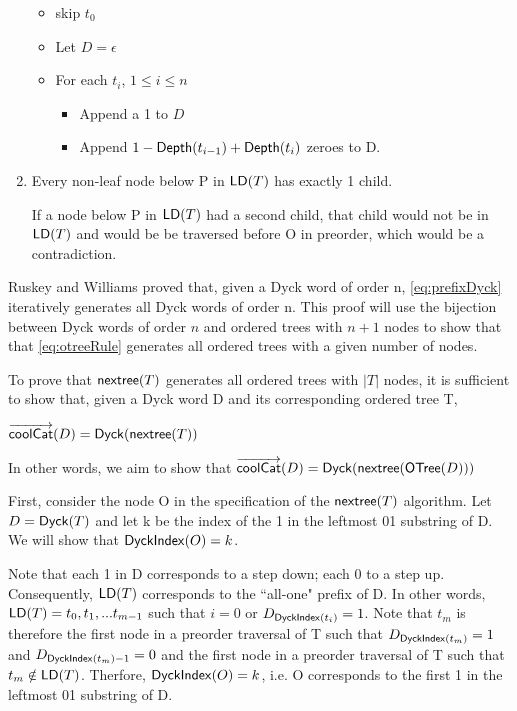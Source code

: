\begin{enumerate}
	\begin{itemize}
 	\item skip $t_0$
	    \item Let $D=\epsilon$ %
	\item For each $t_i$, $1\le i \le n$
	\begin{itemize}
 	\item Append a 1 to $D$
	\item Append $1-\mathsf{Depth}{(t_{i-1})}+\mathsf{Depth}{(t_{i})}$ zeroes to D.
 \end{itemize}
 \end{itemize}
 \item Every non-leaf node below P in $\mathsf{LD}{(T)}$ has exactly 1 child.  

     If a node below P in $\mathsf{LD}{(T)}$ had a second child, that child would not be in $\mathsf{LD}{(T)}$ and would be be traversed before O in preorder, which would be a contradiction. 


\end{enumerate}

Ruskey and Williams proved that, given a Dyck word of order n, \ref{eq:prefixDyck} iteratively generates all Dyck words of order n.  This proof will use the bijection between Dyck words of order $n$ and ordered trees with $n+1$ nodes to show that that \ref{eq:otreeRule} generates all ordered trees with a given number of nodes.  

To prove that $\mathsf{nextree}{(T)}$ generates all ordered trees with $|T|$ nodes, it is sufficient to show that, given a Dyck word D and its corresponding ordered tree T, 

$\overrightarrow{\mathsf{coolCat}}{(D)}=\mathsf{Dyck}{(\mathsf{nextree}{(T)})}$

\bigskip


In other words, we aim to show that $\overrightarrow{\mathsf{coolCat}}{(D)}=\mathsf{Dyck}{(\mathsf{nextree}{(\mathsf{OTree}{(D)})})}$


First, consider the node O in the specification of the $\mathsf{nextree}{(T)}$ algorithm.  Let $D=\mathsf{Dyck}{(T)}$ and let k be the index of the 1 in the leftmost 01 substring of D.  We will show that $\mathsf{DyckIndex}{(O)}=k$.  

Note that each 1 in D corresponds to a step down; each 0 to a step up.  Consequently, $\mathsf{LD}{(T)}$ corresponds to the ``all-one" prefix of D.  In other words, $\mathsf{LD}{(T)}=t_0,t_1,...t_{m-1}$ such that $i=0$ or $D_{\mathsf{DyckIndex}{(t_i)}}=1$. Note that $t_m$ is therefore the first node in a preorder traversal of T such that $D_{\mathsf{DyckIndex}{(t_m)}}=1$ and $D_{\mathsf{DyckIndex}{(t_m)}-1}=0$ and the first node in a preorder traversal of T such that $t_m \notin \mathsf{LD}{(T)}$.  Therfore, $\mathsf{DyckIndex}{(O)}=k$, i.e. O corresponds to the first 1 in the leftmost 01 substring of D.


